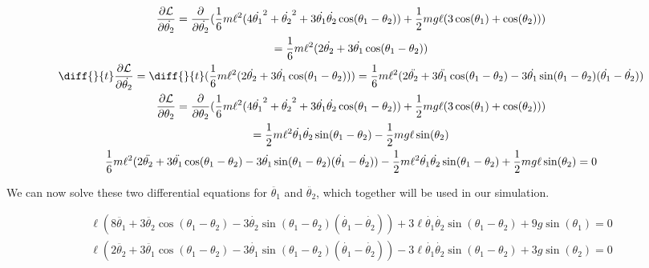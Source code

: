 \documentclass[]{article}
\begin{document}
\begin{gather*}
	\frac{\partial \lagr}{\partial \dot{\theta_2}} = \frac{\partial}{\partial \dot{\theta_2}}(\frac16m\ell^2(4\dot{\theta_1}^2 + \dot{\theta_2}^2 + 3\dot{\theta_1}\dot{\theta_2}\cos(\theta_1 - \theta_2)) + \frac12 mg\ell(3\cos(\theta_1) + \cos(\theta_2))) \\= \frac16m\ell^2(2\dot{\theta_2} + 3\dot{\theta_1}\cos(\theta_1 - \theta_2)) \\
	\diff{}{t}\frac{\partial \lagr}{\partial \dot{\theta_2}} = \diff{}{t}(\frac16m\ell^2(2\dot{\theta_2} + 3\dot{\theta_1}\cos(\theta_1 - \theta_2))) = \frac16m\ell^2(2\ddot{\theta_2} + 3\ddot{\theta_1}\cos(\theta_1 - \theta_2) - 3\dot{\theta_1}\sin(\theta_1 - \theta_2)(\dot{\theta_1} - \dot{\theta_2})) \\
	\frac{\partial \lagr}{\partial \theta_2} = \frac{\partial}{\partial \theta_2}(\frac16m\ell^2(4\dot{\theta_1}^2 + \dot{\theta_2}^2 + 3\dot{\theta_1}\dot{\theta_2}\cos(\theta_1 - \theta_2)) + \frac12 mg\ell(3\cos(\theta_1) + \cos(\theta_2))) \\
	= \frac12m\ell^2\dot{\theta_1}\dot{\theta_2}\sin(\theta_1 - \theta_2) - \frac12mg\ell\sin(\theta_2) \\
	\frac16m\ell^2(2\ddot{\theta_2} + 3\ddot{\theta_1}\cos(\theta_1 - \theta_2) - 3\dot{\theta_1}\sin(\theta_1 - \theta_2)(\dot{\theta_1} - \dot{\theta_2})) - \frac12m\ell^2\dot{\theta_1}\dot{\theta_2}\sin(\theta_1 - \theta_2) + \frac12mg\ell\sin(\theta_2) = 0
\end{gather*}

We can now solve these two differential equations for $\ddot{\theta_1}$ and $\ddot{\theta_2}$, which together will be used in our simulation.

\begin{gather*}
	\ell(8\ddot{\theta_1} + 3\ddot{\theta_2}\cos(\theta_1 - \theta_2) - 3\dot{\theta_2}\sin(\theta_1 - \theta_2)(\dot{\theta_1} - \dot{\theta_2})) + 3\ell\dot{\theta_1}\dot{\theta_2}\sin(\theta_1 - \theta_2) + 9g\sin(\theta_1) =  0 \\
	\ell(2\ddot{\theta_2} + 3\ddot{\theta_1}\cos(\theta_1 - \theta_2) - 3\dot{\theta_1}\sin(\theta_1 - \theta_2)(\dot{\theta_1} - \dot{\theta_2})) - 3\ell\dot{\theta_1}\dot{\theta_2}\sin(\theta_1 - \theta_2) + 3g\sin(\theta_2) = 0 \\
\end{gather*}
\end{document}
